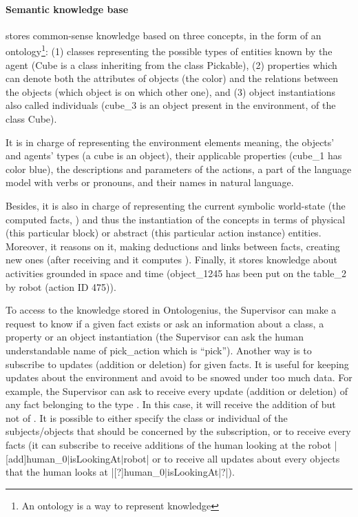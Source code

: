 \documentclass[a4paper,11pt,twoside]{StyleThese}
\begin{document}
\paragraph{Semantic knowledge base} stores common-sense knowledge based on three concepts, in the form of an ontology\footnote{An ontology is a way to represent knowledge}: (1) classes representing the possible types of entities known by the agent (\eg Cube is a class inheriting from the class Pickable), (2) properties which can denote both the attributes of objects (\eg the color) and the relations between the objects (\eg which object is on which other one), and (3) object instantiations also called individuals (\eg cube\_3 is an object present in the environment, of the class Cube).

It is in charge of representing the environment elements meaning, the objects' and agents' types (\eg a cube is an object), their applicable properties (\eg cube\_1 has color blue), the descriptions and parameters of the actions, a part of the language model with verbs or pronouns, and their names in natural language.
	
Besides, it is also in charge of representing the current symbolic world-state (the computed facts, \eg {}) and thus the instantiation of the concepts in terms of physical (\eg this particular block) or abstract (\eg this particular action instance) entities. Moreover, it reasons on it, making deductions and links between facts, creating new ones (\eg after receiving  and it computes ). Finally, it stores knowledge about activities grounded in space and time (\eg object\_1245 has been put on the table\_2 by robot (action ID 475)).

To access to the knowledge stored in Ontologenius, the Supervisor can make a request to know if a given fact exists or ask an information about a class, a property or an object instantiation (\eg the Supervisor can ask the human understandable name of pick\_action which is ``pick''). Another way is to subscribe to updates (addition or deletion) for given facts. It is useful for keeping updates about the environment and avoid to be snowed under too much data. For example, the Supervisor can ask to receive every update (addition or deletion) of any fact belonging to the type . In this case, it will receive the addition of  but not of . It is possible to either specify the class or individual of the subjects/objects that should be concerned by the subscription, or to receive every facts (\eg it can subscribe to receive additions of the human looking at the robot |[add]human_0$\lvert$isLookingAt$\lvert$robot| or to receive all updates about every objects that the human looks at |[?]human_0$\lvert$isLookingAt$\lvert$?|). 
\end{document}
